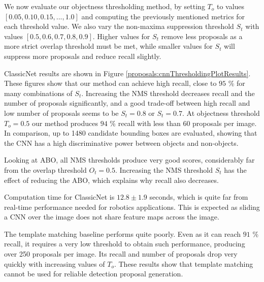 We now evaluate our objectness thresholding method, by setting $T_o$ to values $[0.05, 0.10, 0.15, ..., 1.0]$ and computing the previously mentioned metrics for each threshold value. We also vary the non-maxima suppression threshold $S_t$ with values $[0.5, 0.6, 0.7, 0.8, 0.9]$. Higher values for $S_t$ remove less proposals as a more strict overlap threshold must be met, while smaller values for $S_t$ will suppress more proposals and reduce recall slightly.

ClassicNet results are shown in Figure \ref{proposals:cnnThresholdingPlotResults}. These figures show that our method can achieve high recall, close to $95$ \% for many combinations of $S_t$. Increasing the NMS threshold decreases recall and the number of proposals significantly, and a good trade-off between high recall and low number of proposals seems to be $S_t = 0.8$ or $S_t = 0.7$. At objectness threshold $T_o = 0.5$ our method produces $94$ \% recall with less than 60 proposals per image. In comparison, up to 1480 candidate bounding boxes are evaluated, showing that the CNN has a high discriminative power between objects and non-objects.

Looking at ABO, all NMS thresholds produce very good scores, considerably far from the overlap threshold $O_t = 0.5$. Increasing the NMS threshold $S_t$ has the effect of reducing the ABO, which explains why recall also decreases.

Computation time for ClassicNet is $12.8 \pm 1.9$ seconds, which is quite far from real-time performance needed for robotics applications. This is expected as sliding a CNN over the image does not share feature maps across the image.

The template matching baseline performs quite poorly. Even as it can reach $91$ \% recall, it requires a very low threshold to obtain such performance, producing over 250 proposals per image. Its recall and number of proposals drop very quickly with increasing values of $T_o$. These results show that template matching cannot be used for reliable detection proposal generation.

